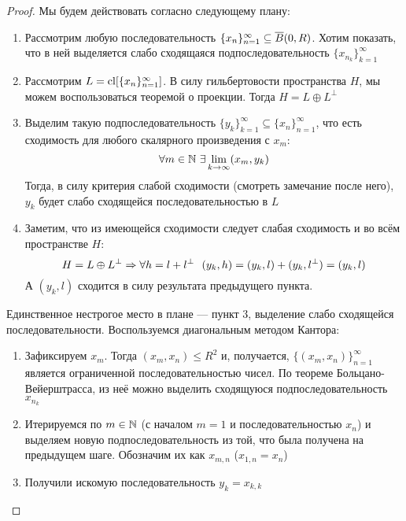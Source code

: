 \begin{proof}
	Мы будем действовать согласно следующему плану:
	\begin{enumerate}
		\item Рассмотрим любую последовательность $\{x_n\}_{n = 1}^\infty \subseteq \overline{B}(0, R)$. Хотим показать, что в ней выделяется слабо сходящаяся подпоследовательность $\{x_{n_k}\}_{k = 1}^\infty$
		
		\item Рассмотрим $L = \operatorname{cl} [\{x_n\}_{n = 1}^\infty]$. В силу гильбертовости пространства $H$, мы можем воспользоваться теоремой о проекции. Тогда $H = L \oplus L^\bot$
		
		\item Выделим такую подпоследовательность $\{y_k\}_{k = 1}^\infty \subseteq \{x_n\}_{n = 1}^\infty$, что есть сходимость для любого скалярного произведения с $x_m$:
		\[
			\forall m \in \mathbb{N}\ \exists \lim_{k \to \infty} (x_m, y_k)
		\]
		Тогда, в силу критерия слабой сходимости (смотреть замечание после него), $y_k$ будет слабо сходящейся последовательностью в $L$
		
		\item Заметим, что из имеющейся сходимости следует слабая сходимость и во всём пространстве $H$:
		\[
			 H = L \oplus L^\bot \Rightarrow \forall h = l + l^\bot\ \ (y_k, h) = (y_k, l) + (y_k, l^\bot) = (y_k, l)
		\]
		А $(y_k, l)$ сходится в силу результата предыдущего пункта.
	\end{enumerate}
	Единственное нестрогое место в плане --- пункт 3, выделение слабо сходящейся последовательности. Воспользуемся диагональным методом Кантора:
	\begin{enumerate}
		\item Зафиксируем $x_m$. Тогда $(x_m, x_n) \le R^2$ и, получается, $\{(x_m, x_n)\}_{n = 1}^\infty$ является ограниченной последовательностью чисел. По теореме Больцано-Вейерштрасса, из неё можно выделить сходящуюся подпоследовательность $x_{n_k}$
		
		\item Итерируемся по $m \in \mathbb{N}$ (с началом $m = 1$ и последовательностью $x_n$) и выделяем новую подпоследовательность из той, что была получена на предыдущем шаге. Обозначим их как $x_{m, n}$ ($x_{1, n} = x_n$)
		
		\item Получили искомую последовательность $y_k = x_{k, k}$
	\end{enumerate}
\end{proof}